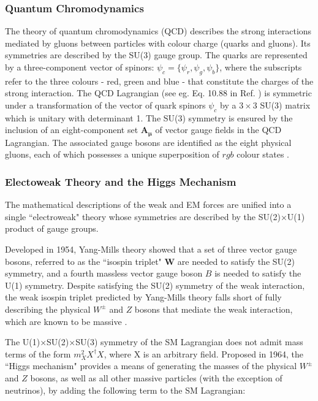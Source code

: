 \subsubsection{Quantum Chromodynamics}

The theory of quantum chromodynamics (QCD) \cite{qcd_2007} describes the strong interactions mediated by gluons between particles with colour charge (quarks and gluons). Its symmetries are described by the SU(3) gauge group. The quarks are represented by a three-component vector of spinors: \(\psi_c = \{\psi_r, \psi_g, \psi_b\}\), where the subscripts refer to the three colours - red, green and blue - that constitute the charges of the strong interaction. The QCD Lagrangian (see eg. Eq. 10.88 in Ref. \cite{griffiths_2008}) is symmetric under a transformation of the vector of quark spinors \(\psi_c\) by a \(3\times3\) SU(3) matrix which is unitary with determinant 1. The SU(3) symmetry is ensured by the inclusion of an eight-component set \(\boldsymbol{\boldsymbol{A}_\mu}\) of vector gauge fields in the QCD Lagrangian. The associated gauge bosons are identified as the eight physical gluons, each of which possesses a unique superposition of \({rgb}\) colour states \cite{griffiths_2008}.

\subsubsection{Electoweak Theory and the Higgs Mechanism}

The mathematical descriptions of the weak and EM forces are unified into a single ``electroweak" \cite{electroweak_2012} theory whose symmetries are described by the SU(2)\(\times\)U(1) product of gauge groups. 

Developed in 1954, Yang-Mills theory \cite{yang_mills_1954} showed that a set of three vector gauge bosons, referred to as the ``isospin triplet" \(\boldsymbol{W}\) are needed to satisfy the SU(2) symmetry, and a fourth massless vector gauge boson \(B\) is needed to satisfy the U(1) symmetry. Despite satisfying the SU(2) symmetry of the weak interaction, the weak isospin triplet predicted by Yang-Mills theory falls short of fully describing the physical \(W^{\pm}\) and \(Z\) bosons that mediate the weak interaction, which are known to be massive \cite{pdg_2018}.

The U(1)\(\times\)SU(2)\(\times\)SU(3) symmetry of the SM Lagrangian does not admit mass terms of the form \(m_X^2X^\dagger X\), where X is an arbitrary field. Proposed in 1964, the ``Higgs mechanism" \cite{HiggsTheory1,HiggsTheory2,HiggsTheory3} provides a means of generating the masses of the physical \(W^\pm\) and \(Z\) bosons, as well as all other massive particles (with the exception of neutrinos), by adding the following term to the SM Lagrangian:

